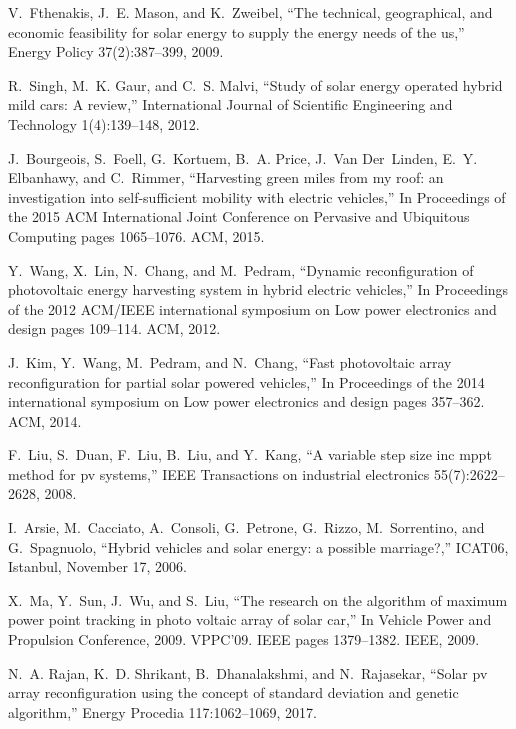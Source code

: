 V.~Fthenakis, J.~E. Mason, and K.~Zweibel,
\newblock ``The technical, geographical, and economic feasibility for solar
  energy to supply the energy needs of the us,''
\newblock Energy Policy 37(2):387--399, 2009.

R.~Singh, M.~K. Gaur, and C.~S. Malvi,
\newblock ``Study of solar energy operated hybrid mild cars: A review,''
\newblock International Journal of Scientific Engineering and Technology
  1(4):139--148, 2012.

J.~Bourgeois, S.~Foell, G.~Kortuem, B.~A. Price, J.~Van Der~Linden, E.~Y. Elbanhawy, and C.~Rimmer,
\newblock ``Harvesting green miles from my roof: an investigation into
  self-sufficient mobility with electric vehicles,''
\newblock In Proceedings of the 2015 ACM International Joint Conference on Pervasive and Ubiquitous Computing pages 1065--1076. ACM, 2015.

Y.~Wang, X.~Lin, N.~Chang, and M.~Pedram,
\newblock ``Dynamic reconfiguration of photovoltaic energy harvesting system in
  hybrid electric vehicles,''
\newblock In Proceedings of the 2012 ACM/IEEE international symposium on
  Low power electronics and design pages 109--114. ACM, 2012.

J.~Kim, Y.~Wang, M.~Pedram, and N.~Chang,
\newblock ``Fast photovoltaic array reconfiguration for partial solar powered
  vehicles,''
\newblock In Proceedings of the 2014 international symposium on Low power
  electronics and design pages 357--362. ACM, 2014.
  
F.~Liu, S.~Duan, F.~Liu, B.~Liu, and Y.~Kang,
\newblock ``A variable step size inc mppt method for pv systems,''
\newblock IEEE Transactions on industrial electronics 55(7):2622--2628,
  2008.
  
I.~Arsie, M.~Cacciato, A.~Consoli, G.~Petrone, G.~Rizzo, M.~Sorrentino, and G.~Spagnuolo,
\newblock ``Hybrid vehicles and solar energy: a possible marriage?,''
\newblock ICAT06, Istanbul, November 17, 2006.
  
X.~Ma, Y.~Sun, J.~Wu, and S.~Liu,
\newblock ``The research on the algorithm of maximum power point tracking in photo voltaic array of solar car,''
\newblock In Vehicle Power and Propulsion Conference, 2009. VPPC'09.
  IEEE pages 1379--1382. IEEE, 2009.
 
N.~A. Rajan, K.~D. Shrikant, B.~Dhanalakshmi, and N.~Rajasekar,
\newblock ``Solar pv array reconfiguration using the concept of standard
  deviation and genetic algorithm,''
\newblock Energy Procedia 117:1062--1069, 2017.
  
